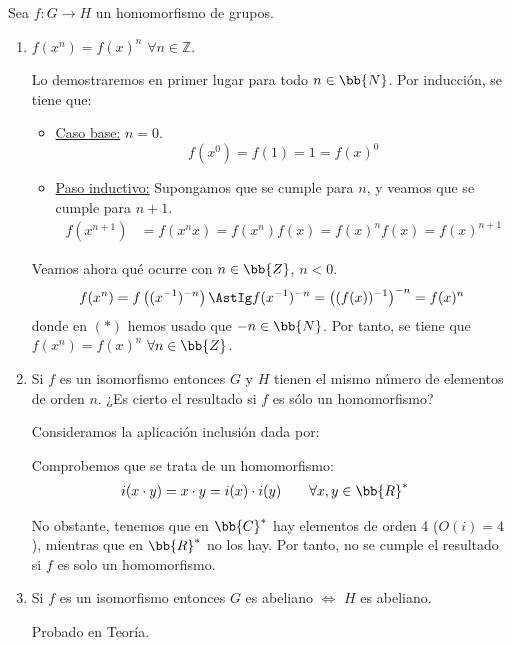 \begin{ejercicio}\label{ej:2.35}
    Sea $f : G \to H$ un homomorfismo de grupos.
    \begin{enumerate}
        \item $f(x^n) = f(x)^n$ $\forall n \in \mathbb{Z}$.
        
        Lo demostraremos en primer lugar para todo $n\in \bb{N}$. Por inducción, se tiene que:
        \begin{itemize}
            \item \ul{Caso base:} $n=0$.
            \begin{equation*}
                f(x^0)=f(1)=1=f(x)^0
            \end{equation*}

            \item \ul{Paso inductivo:} Supongamos que se cumple para $n$, y veamos que se cumple para $n+1$.
            \begin{align*}
                f(x^{n+1})&=f(x^n x)=f(x^n)f(x)=f(x)^n f(x)=f(x)^{n+1}
            \end{align*}
        \end{itemize}

        Veamos ahora qué ocurre con $n\in \bb{Z}$, $n<0$.
        \begin{equation*}
            f(x^n)=f\left((x^{-1})^{-n}\right)\AstIg f(x^{-1})^{-n} = \left((f(x))^{-1}\right)^{-n} = f(x)^n
        \end{equation*}
        donde en $(\ast)$ hemos usado que $-n\in \bb{N}$.
        Por tanto, se tiene que $f(x^n)=f(x)^n$ $\forall n\in \bb{Z}$.
        \item Si $f$ es un isomorfismo entonces $G$ y $H$ tienen el mismo número de elementos de orden $n$. ¿Es cierto el resultado si $f$ es sólo un homomorfismo?
        
        Consideramos la aplicación inclusión dada por:

        Comprobemos que se trata de un homomorfismo:
        \begin{align*}
            i(x\cdot y)&=x\cdot y=i(x)\cdot i(y)\qquad \forall x,y\in \bb{R}^*
        \end{align*}

        No obstante, tenemos que en $\bb{C}^*$ hay elementos de orden 4 ($O(i)=4$), mientras que en $\bb{R}^*$ no los hay. Por tanto, no se cumple el resultado si $f$ es solo un homomorfismo.
        \item Si $f$ es un isomorfismo entonces $G$ es abeliano $\Leftrightarrow$ $H$ es abeliano.
        
        Probado en Teoría.
    \end{enumerate}
\end{ejercicio}

